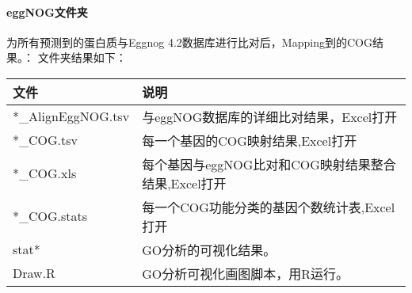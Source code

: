 \paragraph{eggNOG文件夹}
为所有预测到的蛋白质与Eggnog 4.2数据库进行比对后，Mapping到的COG结果。：
文件夹结果如下：
\begin{table}[H]
        \begin{center}
            \begin{threeparttable}
                \begin{tabularx}{\textwidth}{XX}

                    \toprule
                    \bfseries{文件}                  &\bfseries{说明}\\
                    \midrule
                    *\_AlignEggNOG.tsv              &与eggNOG数据库的详细比对结果，Excel打开\\
                    *\_COG.tsv                      &每一个基因的COG映射结果,Excel打开\\
                    *\_COG.xls                      &每个基因与eggNOG比对和COG映射结果整合结果,Excel打开\\
                    *\_COG.stats                    &每一个COG功能分类的基因个数统计表,Excel打开\\
                    stat*                           &  GO分析的可视化结果。\\
                    Draw.R                          &GO分析可视化画图脚本，用R运行。\\
                    \bottomrule

                \end{tabularx}

            \end{threeparttable}
        \end{center}
\end{table}

